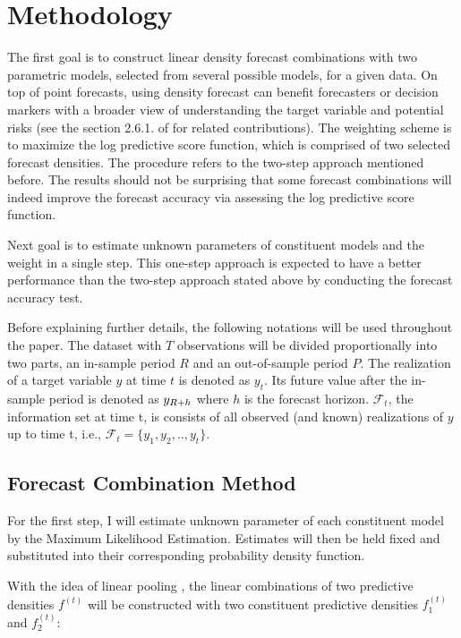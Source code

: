 \documentclass{monashthesis}
\begin{document}
\hypertarget{methodology}{%
\chapter{Methodology}\label{methodology}}

The first goal is to construct linear density forecast combinations with two parametric models, selected from several possible models, for a given data. On top of point forecasts, using density forecast can benefit forecasters or decision markers with a broader view of understanding the target variable and potential risks (see the section 2.6.1. of \textcite{FTP22} for related contributions). The weighting scheme is to maximize the log predictive score function, which is comprised of two selected forecast densities. The procedure refers to the two-step approach mentioned before. The results should not be surprising that some forecast combinations will indeed improve the forecast accuracy via assessing the log predictive score function.

Next goal is to estimate unknown parameters of constituent models and the weight in a single step. This one-step approach is expected to have a better performance than the two-step approach stated above by conducting the forecast accuracy test.

Before explaining further details, the following notations will be used throughout the paper. The dataset with \(T\) observations will be divided proportionally into two parts, an in-sample period \(R\) and an out-of-sample period \(P\). The realization of a target variable \(y\) at time \(t\) is denoted as \(y_{t}\). Its future value after the in-sample period is denoted as \(y_{\small{R+h}}\) where \(h\) is the forecast horizon. \(\mathcal{F}_t\), the information set at time t, is consists of all observed (and known) realizations of \(y\) up to time t, i.e., \(\mathcal{F}_t = \{y_1, y_2, .., y_t\}\).

\hypertarget{forecast-combination-method}{%
\section{Forecast Combination Method}\label{forecast-combination-method}}

For the first step, I will estimate unknown parameter of each constituent model by the Maximum Likelihood Estimation. Estimates will then be held fixed and substituted into their corresponding probability density function.

With the idea of linear pooling \autocite{BG69,HM07,GA11}, the linear combinations of two predictive densities \(f^{(t)}\) will be constructed with two constituent predictive densities \(f^{(t)}_1\) and \(f^{(t)}_2\):
\end{document}
